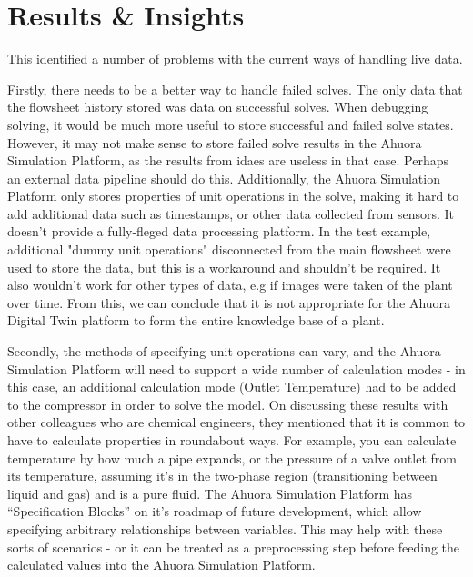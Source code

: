 \section{Results \& Insights}

This identified a number of problems with the current ways of handling live data.

Firstly, there needs to be a better way to handle failed solves. The only data that the flowsheet history stored was data on successful solves. When debugging solving, it would be much more useful to store successful and failed solve states. However, it may not make sense to store failed solve results in the Ahuora Simulation Platform, as the results from idaes are useless in that case. 
Perhaps an external data pipeline should do this. Additionally, the Ahuora Simulation Platform only stores properties of unit operations in the solve, making it hard to add additional data such as timestamps, or other data collected from sensors. It doesn't provide a fully-fleged data processing platform. 
In the test example, additional "dummy unit operations" disconnected from the main flowsheet were used to store the data, but this is a workaround and shouldn't be required. It also wouldn't work for other types of data, e.g if images were taken of the plant over time. From this, we can conclude that it is not appropriate for the Ahuora Digital Twin platform to form the entire knowledge base of a plant.

Secondly, the methods of specifying unit operations can vary, and the Ahuora Simulation Platform will need to support a wide number of calculation modes - in this case, an additional calculation mode (Outlet Temperature) had to be added to the compressor in order to solve the model. On discussing these results with other colleagues who are chemical engineers, they mentioned that it is common to have to calculate properties in roundabout ways. 
For example, you can calculate temperature by how much a pipe expands, or the pressure of a valve outlet from its temperature, assuming it's in the two-phase region (transitioning between liquid and gas) and is a pure fluid. The Ahuora Simulation Platform has ``Specification Blocks'' on it's roadmap of future development, which allow specifying arbitrary relationships between variables. This may help with these sorts of scenarios - or it can be treated as a preprocessing step before feeding the calculated values into the Ahuora Simulation Platform.

